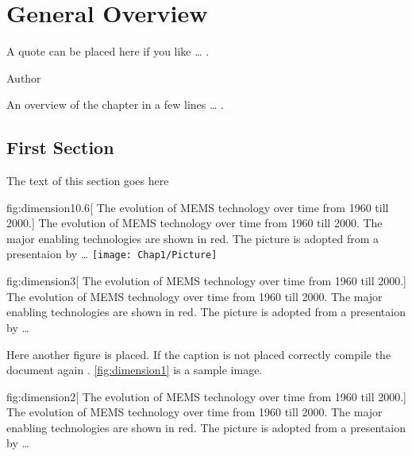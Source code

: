 \chapter{General Overview} 
\label{chap:introduction}
\epigraph{\epifont\SingleSpacing
A quote can be placed here if you like \ldots{} .\\[1em]
}{Author}

\begin{chapteroverview}  
An overview of the chapter in a few lines \ldots{} .
\end{chapteroverview}

\section{First Section} 
\label{sec:mems} 
The text of this section goes here

\begin{raggedsidecap}{fig:dimension1}{0.6\maxsidecapfloatwidth}[%
The evolution of MEMS technology over time from 1960 till 2000.]{%
The evolution of MEMS technology over time from 1960 till
2000. The major enabling technologies are shown in red. The picture is
adopted from a presentaion by \ldots}
  \texttt{[image: Chap1/Picture]}
\end{raggedsidecap}

\begin{raggedsidecap}{fig:dimension3}{\maxsidecapfloatwidth}[%
The evolution of MEMS technology over time from 1960 till 2000.]{%
 The evolution of MEMS technology over time from 1960 till
2000.  The major enabling technologies are shown in red. The picture is
adopted from a presentaion by \ldots}
\hfill%
\end{raggedsidecap}

\clearpage

Here another figure is placed. If the caption is not placed correctly
compile the document again \cite{Jahanshahi13:JMEMS}. \vref{fig:dimension1} is a sample image.
\begin{raggedsidecap}{fig:dimension2}{\maxsidecapfloatwidth}[%
The evolution of MEMS technology over time from 1960 till 2000.]{%
The evolution of MEMS technology over time from 1960 till
2000. The major enabling technologies are shown in red. The picture is
adopted from a presentaion by \ldots}
\end{raggedsidecap}


